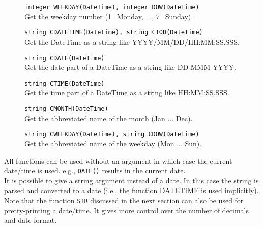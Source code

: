 \begin{description}
  \item[] \texttt{integer WEEKDAY(DateTime),  integer DOW(DateTime)}\\
        Get the weekday number (1=Monday, ..., 7=Sunday).
  \item[] \texttt{string CDATETIME(DateTime),  string CTOD(DateTime)}\\
        Get the DateTime as a string like YYYY/MM/DD/HH:MM:SS.SSS.
  \item[] \texttt{string CDATE(DateTime)}\\
        Get the date part of a DateTime as a string like DD-MMM-YYYY.
  \item[] \texttt{string CTIME(DateTime)}\\
        Get the time part of a DateTime as a string like HH:MM:SS.SSS.
  \item[] \texttt{string CMONTH(DateTime)}\\
        Get the abbreviated name of the month (Jan ... Dec).
  \item[] \texttt{string CWEEKDAY(DateTime),  string CDOW(DateTime)}\\
        Get the abbreviated name of the weekday (Mon ... Sun).
\end{description}
All functions can be used without an argument in which case the current
date/time is used. e.g., \texttt{DATE()} results in the current date.
\\It is possible to give a string argument instead of a date. In this
case the string is parsed and converted to a date (i.e., the
function DATETIME is used implicitly).
\\Note that the function \texttt{STR} discussed in the next section can also be
used for pretty-printing a date/time. It gives more control over the
number of decimals and date format.

